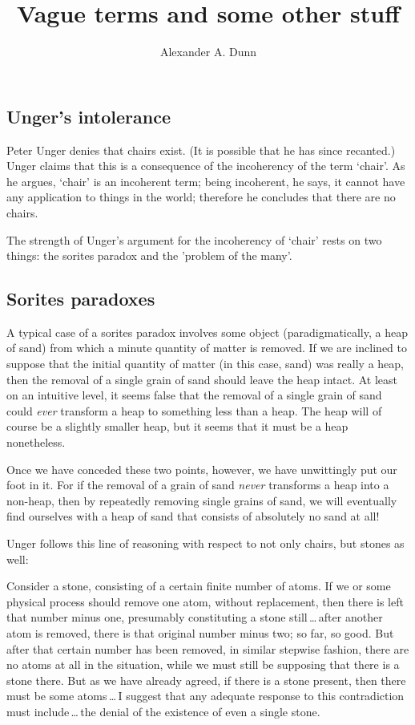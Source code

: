 \documentclass[11pt]{article}
\title{Vague terms and some other stuff}
\author{Alexander A. Dunn}
\newenvironment{squote}{%
\begin{spacing}{1}
       	\begin{list}{}{%
\setlength{\labelwidth}{0pt}%
\rightmargin\leftmargin%
}
\item\relax
}{%
\end{list}%
\end{spacing}
}
\begin{document}
\ifstandalone
\maketitle
\begin{spacing}{1.5}
\fi

\section{Unger's intolerance}
\noindent Peter Unger denies that chairs exist.  (It is possible that
he has since recanted.)  Unger claims that this is a consequence of
the incoherency of the term `chair'.  As he argues, `chair' is an
incoherent term; being incoherent, he says, it cannot have any
application to things in the world; therefore he concludes that there
are no chairs.

The strength of Unger's argument for the incoherency of `chair' rests
on two things: the sorites paradox and the 'problem of the many'.

\subsection{Sorites paradoxes}
A typical case of a sorites paradox involves some object
(paradigmatically, a heap of sand) from which a minute quantity of
matter is removed.  If we are inclined to suppose that the initial
quantity of matter (in this case, sand) was really a heap, then the
removal of a single grain of sand should leave the heap intact.  At
least on an intuitive level, it seems false that the removal of a
single grain of sand could {\em ever} transform a heap to something
less than a heap.  The heap will of course be a slightly smaller heap,
but it seems that it must be a heap nonetheless.

Once we have conceded these two points, however, we have unwittingly
put our foot in it.  For if the removal of a grain of sand {\em never}
transforms a heap into a non-heap, then by repeatedly removing single
grains of sand, we will eventually find ourselves with a heap of sand
that consists of absolutely no sand at all!

Unger follows this line of reasoning with respect to not only chairs,
but stones as well:

\begin{squote}
Consider a stone, consisting of a certain finite number of atoms.  If
we or some physical process should remove one atom, without
replacement, then there is left that number minus one, presumably
constituting a stone still\,\ldots\,after another atom is removed,
there is that original number minus two; so far, so good.  But after
that certain number has been removed, in similar stepwise fashion,
there are no atoms at all in the situation, while we must still be
supposing that there is a stone there.  But as we have already agreed,
if there is a stone present, then there must be some atoms\,\ldots\,I
suggest that any adequate response to this contradiction must
include\,\ldots\,the denial of the existence of even a single
stone.~\citep[121--122]{unger1979}
\end{squote}


\end{spacing}
\end{document}
